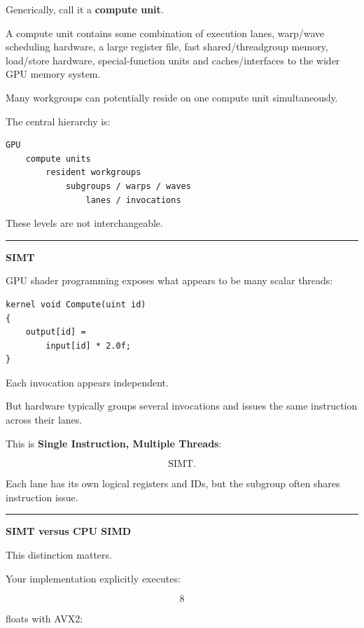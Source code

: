 Generically, call it a \textbf{compute unit}.

A compute unit contains some combination of execution lanes, warp/wave scheduling hardware, a large register file, fast shared/threadgroup memory, load/store hardware, special-function units and caches/interfaces to the wider GPU memory system.

Many workgroups can potentially reside on one compute unit simultaneously.

The central hierarchy is:

\protect{}\label{5kw7e9}%
\begin{verbatim}
GPU
    compute units
        resident workgroups
            subgroups / warps / waves
                lanes / invocations
\end{verbatim}

These levels are not interchangeable.

\begin{center}\rule{0.5\linewidth}{0.5pt}\end{center}

\textbf{SIMT}

GPU shader programming exposes what appears to be many scalar threads:

\protect{}\label{e937zu}%
\begin{verbatim}
kernel void Compute(uint id)
{
    output[id] =
        input[id] * 2.0f;
}
\end{verbatim}

Each invocation appears independent.

But hardware typically groups several invocations and issues the same instruction across their lanes.

This is \textbf{Single Instruction, Multiple Threads}:

\[
\boxed{\text{SIMT}.}
\]

Each lane has its own logical registers and IDs, but the subgroup often shares instruction issue.

\begin{center}\rule{0.5\linewidth}{0.5pt}\end{center}

\textbf{SIMT versus CPU SIMD}

This distinction matters.

Your  implementation explicitly executes:

\[
8
\]

floats with AVX2:

